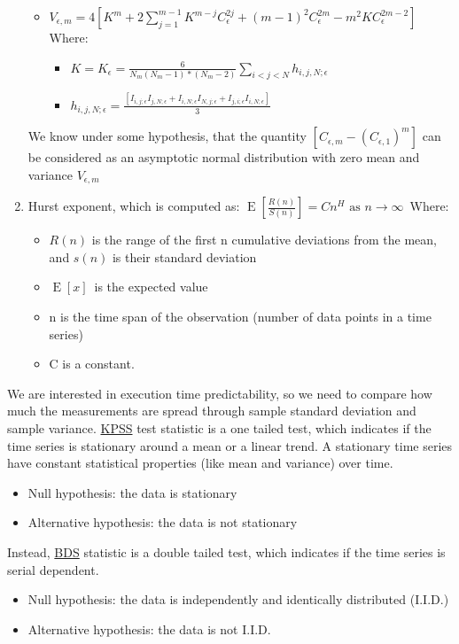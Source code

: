 \begin{enumerate}
\begin{itemize}
		\item $V_{\epsilon,m} = 4[{K}^{m} + 2\sum_{j=1}^{m-1}{K}^{m-j}{C}^{2j}_\epsilon + {(m-1)}^{2}{C}^{2m}_\epsilon - {m}^{2}K{C}^{2m-2}_\epsilon]$
		Where:
		\begin{itemize}
			\item $K=K_\epsilon = \frac{6}{N_m(N_m-1)*(N_m-2)}\sum_{i<j<N}h_{i,j,N;\epsilon}$
			\item $h_{i,j,N;\epsilon} = \frac{[I_{i,j;\epsilon}I_{j,N;\epsilon}+I_{i,N;\epsilon}I_{N,j;\epsilon}+I_{j,i;\epsilon}I_{i,N;\epsilon}]}{3}$
		\end{itemize}
	\end{itemize}
	We know under some hypothesis, that the quantity $[C_{\epsilon,m}-{(C_{\epsilon,1})}^{m}]$ can be considered as an asymptotic normal distribution with zero mean and variance $V_{\epsilon,m}$
	\item Hurst exponent, which is computed as:
	$\operatorname{E} \left [ \frac{R(n)}{S(n)} \right ]=C n^H  \text{  as } n \to \infty  \, $
	Where:
	\begin{itemize}
		\item $R(n)$ is the range of the first n cumulative deviations from the mean, and $s(n)$ is their standard deviation
		\item $\operatorname{E} \left [x \right ] \,$ is the expected value
		\item n is the time span of the observation (number of data points in a time series)
		\item C is a constant.
	\end{itemize}
\end{enumerate}

We are interested in execution time predictability, so we need to compare how much the measurements are spread through sample standard deviation and sample variance.
\href{http://debis.deu.edu.tr/userweb//onder.hanedar/dosyalar/kpss.pdf}{KPSS} test statistic is a one tailed test, which indicates if the time series is stationary around a mean or a linear trend. A stationary time series have constant statistical properties (like mean and variance) over time.
\begin{itemize}
	\item Null hypothesis: the data is stationary
	\item Alternative hypothesis: the data is not stationary
\end{itemize}
Instead, \href{https://www.researchgate.net/publication/46554708_A_Fast_Algorithm_for_the_BDS_Statistic}{BDS} statistic is a double tailed test, which indicates if the time series is serial dependent.
\begin{itemize}
 	\item Null hypothesis: the data is independently and identically distributed (I.I.D.)
 	\item Alternative hypothesis: the data is not I.I.D.
\end{itemize}

